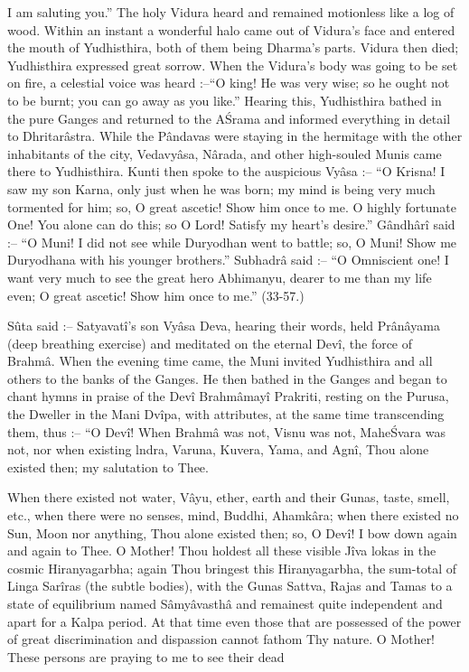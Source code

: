 I am saluting you.'' The holy Vidura heard and remained motionless like a log of wood. Within an instant a wonderful halo came out of Vidura's face and entered the mouth of Yudhisthira, both of them being Dharma's parts. Vidura then died; Yudhisthira expressed great sorrow. When the Vidura's body was going to be set on fire, a celestial voice was heard :--``O king! He was very wise; so he ought not to be burnt; you can go away as you like.'' Hearing this, Yudhisthira bathed in the pure Ganges and returned to the A\'Srama and informed everything in detail to Dhritar\^astra. While the P\^andavas were staying in the hermitage with the other inhabitants of the city, Vedavy\^asa, N\^arada, and other high-souled Munis came there to Yudhisthira. Kunti then spoke to the auspicious Vy\^asa :-- ``O Krisna! I saw my son Karna, only just when he was born; my mind is being very much tormented for him; so, O great ascetic! Show him once to me. O highly fortunate One! You alone can do this; so O Lord! Satisfy my heart's desire.'' G\^andh\^ar\^i said :-- ``O Muni! I did not see while Duryodhan went to battle; so, O Muni! Show me Duryodhana with his younger brothers.'' Subhadr\^a said :-- ``O Omniscient one! I want very much to see the great hero Abhimanyu, dearer to me than my life even; O great ascetic! Show him once to me.'' (33-57.)

S\^uta said :-- Satyavat\^i's son Vy\^asa Deva, hearing their words, held Pr\^an\^ayama (deep breathing exercise) and meditated on the eternal Dev\^i, the force of Brahm\^a. When the evening time came, the Muni invited Yudhisthira and all others to the banks of the Ganges. He then bathed in the Ganges and began to chant hymns in praise of the Dev\^i Brahm\^amay\^i Prakriti, resting on the Purusa, the Dweller in the Mani Dv\^ipa, with attributes, at the same time transcending them, thus :-- ``O Dev\^i! When Brahm\^a was not, Visnu was not, Mahe\'Svara was not, nor when existing lndra, Varuna, Kuvera, Yama, and Agn\^i, Thou alone existed then; my salutation to Thee.

When there existed not water, V\^ayu, ether, earth and their Gunas, taste, smell, etc., when there were no senses, mind, Buddhi, Ahamk\^ara; when there existed no Sun, Moon nor anything, Thou alone existed then; so, O Dev\^i! I bow down again and again to Thee. O Mother! Thou holdest all these visible J\^iva lokas in the cosmic Hiranyagarbha; again Thou bringest this Hiranyagarbha, the sum-total of Linga Sar\^iras (the subtle bodies), with the Gunas Sattva, Rajas and Tamas to a state of equilibrium named S\^amy\^avasth\^a and remainest quite independent and apart for a Kalpa period. At that time even those that are possessed of the power of great discrimination and dispassion cannot fathom Thy nature. O Mother! These persons are praying to me to see their dead

